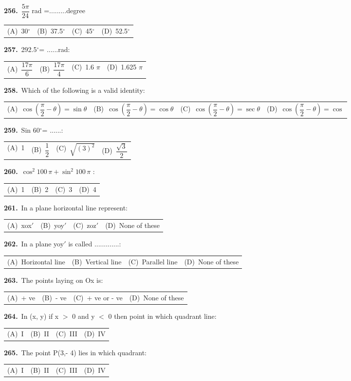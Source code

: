 \documentclass[11pt,a4paper]{article}
\makeatletter
\newcommand{\mcq}[6]{%
  \Needspace{4\baselineskip}%
  \par\medskip\noindent\textbf{#1.}\ #2\par\nopagebreak
  \noindent\begin{tabularx}{\linewidth}{@{\hspace{1.5em}}*{4}{>{\raggedright\arraybackslash}X}@{}}
    (A)~#3 & (B)~#4 & (C)~#5 & (D)~#6
  \end{tabularx}\par}
\makeatother
\begin{document}
\mcq{256}{$\dfrac{5\pi}{24}$ rad =.........degree}{30$^{\circ}$}{37.5$^{\circ}$}{45$^{\circ}$}{52.5$^{\circ}$}
\mcq{257}{292.5$^{\circ}$= ......rad:}{$\dfrac{17\pi}{6}$}{$\dfrac{17\pi}{4}$}{1.6 $\pi$}{1.625 $\pi$}
\mcq{258}{Which of the following is a valid identity:}{$\cos\!\left(\dfrac{\pi}{2}-\theta\right)=\sin\theta$}{$\cos\!\left(\dfrac{\pi}{2}-\theta\right)=\cos\theta$}{$\cos\!\left(\dfrac{\pi}{2}-\theta\right)=\sec\theta$}{$\cos\!\left(\dfrac{\pi}{2}-\theta\right)=\cos$}
\mcq{259}{Sin 60$^{\circ}$= ......:}{1}{$\dfrac{1}{2}$}{$\sqrt{(3)^{2}}$}{$\dfrac{\sqrt{3}}{2}$}
\mcq{260}{$\cos^{2}100\,\pi+\sin^{2}100\,\pi$ :}{1}{2}{3}{4}
\mcq{261}{In a plane horizontal line represent:}{xox$'$}{yoy$'$}{zoz$'$}{None of these}
\mcq{262}{In a plane yoy$'$ is called .............:}{Horizontal line}{Vertical line}{Parallel line}{None of these}
\mcq{263}{The points laying on Ox is:}{+ ve}{- ve}{+ ve or - ve}{None of these}
\mcq{264}{In (x, y) if x $>$ 0 and y $<$ 0 then point in which quadrant line:}{I}{II}{III}{IV}
\mcq{265}{The point P(3,- 4) lies in which quadrant:}{I}{II}{III}{IV}
\end{document}
